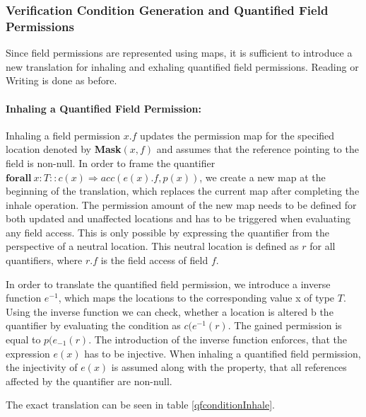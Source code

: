 \documentclass[12pt]{article}
\begin{document}
\subsubsection{Verification Condition Generation and Quantified Field Permissions}
\label{cgqf}
Since field permissions are represented using maps, it is sufficient to introduce a new translation for inhaling and exhaling quantified field permissions. Reading or Writing is done as before. 

\paragraph{Inhaling a Quantified Field Permission: }
Inhaling a field permission \(x.f\) updates the permission map for the specified location denoted by \textbf{Mask}\((x, f)\) and assumes  that the reference pointing to the field is non-null. In order to frame the quantifier \(\mathbf{forall\ } x:T :: c(x) \Rightarrow acc(e(x).f, p(x))\), we create a new map at the beginning of the translation, which replaces the current map after completing the inhale operation. The permission amount of the new map needs to be defined for both updated and unaffected locations and has to be triggered when evaluating any field access. This is only possible by expressing the quantifier from the perspective of a neutral location. This neutral location is defined as \(r\) for all quantifiers, where \(r.f\) is the field access of field \(f\). 

In order to translate the quantified field permission, we introduce a inverse function \(e^{-1}\), which maps the locations to the corresponding value x of type \(T\). Using the inverse function we can check, whether a location is altered b the quantifier by evaluating the condition as \(c(e^{-1}(r)\). The gained permission is equal to \(p(e_{-1}(r)\). 
The introduction of the inverse function enforces, that the expression \(e(x)\) has to be injective. When inhaling a quantified field permission, the injectivity of \(e(x)\) is assumed along with the property, that all references affected by the quantifier are non-null.

The exact translation can be seen in table \ref{qfconditionInhale}.
\end{document}
